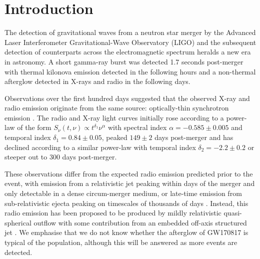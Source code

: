\clearpage
\pagebreak

\section{Introduction}
\vspace{-6pt}
The detection of gravitational waves from a neutron star merger \citep[GW170817;][]{2017PhRvL.119p1101A} by the Advanced Laser Interferometer Gravitational-Wave Observatory (LIGO) and the subsequent detection of counterparts across the electromagnetic spectrum \citep{2017ApJ...848L..12A} heralds a new era in astronomy. A short gamma-ray burst \citep[sGRB;][]{2017ApJ...848L..13A,2017ApJ...848L..14G} was detected 1.7 seconds post-merger with thermal kilonova emission detected in the following hours \citep[][and references therein]{2017Sci...358.1556C,2017ApJ...848L..12A} and a non-thermal afterglow detected in X-rays \citep{2017Sci...358.1565E,2017ApJ...848L..25H,2017Natur.551...71T} and radio \citep{2017Sci...358.1579H} in the following days.

Observations over the first hundred days suggested that the observed X-ray and radio emission originate from the same source: optically-thin synchrotron emission \citep{2018Natur.554..207M}. The radio and X-ray light curves initially rose according to a power-law of the form $S_\nu(t,\nu) \propto t^{\delta_1} \nu^\alpha$ with spectral index $\alpha=-0.585\pm 0.005$ \citep{2018ApJ...856L..18M} and temporal index $\delta_1=0.84\pm 0.05$, peaked $149\pm 2$ days post-merger \citep{2018ApJ...858L..15D} and has declined according to a similar power-law with temporal index $\delta_2=-2.2\pm0.2$ or steeper \citep{2018ApJ...868L..11M,2019MNRAS.489.1919T} out to 300 days post-merger.

These observations differ from the expected radio emission predicted prior to the event, with emission from a relativistic jet peaking within days of the merger and only detectable in a dense circum-merger medium, or late-time emission from sub-relativistic ejecta peaking on timescales of thousands of days \citep[e.g.][]{2012ApJ...746...48M,2016ApJ...831..190H}. Instead, this radio emission has been proposed to be produced by mildly relativistic quasi-spherical outflow \citep[a ``cocoon'';][]{2018MNRAS.473..576G,2018MNRAS.478..407N} with some contribution from an embedded off-axis structured jet \citep{2018PhRvL.120x1103L,2018ApJ...863L..18A,2018A&A...613L...1D,2018ApJ...856L..18M,2018ApJ...867...57R,2018Natur.561..355M}. We emphasise that we do not know whether the afterglow of GW170817 is typical of the population, although this will be answered as more events are detected.

